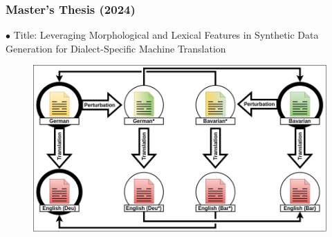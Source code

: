 \documentclass[aspectratio=169]{beamer}
\begin{document}
\begin{frame}[fragile]
	\frametitle{Master's Thesis (2024)}
    {\color{thiscolor}$\bullet$} Title: Leveraging Morphological and Lexical Features in Synthetic Data Generation for Dialect-Specific Machine Translation
    \begin{minipage}{.6\textwidth}
      \begin{figure}
        \centering
        \includegraphics[width=1.0\textwidth]{images/ChameleonMT-MT-ExperimentSetupOverview.png} 
    \end{figure}
    \end{minipage}%
    \begin{minipage}{.4\textwidth}
    \vspace{-4mm}
        \centering
        \begin{figure}
        \centering
        \captionsetup[subfigure]{labelformat=empty}
            \\
        \end{figure}
    \end{minipage}
   \end{frame}
\end{document}
